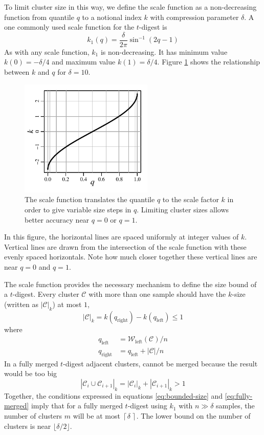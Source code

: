 \documentclass[]{statsoc}
\begin{document}
To limit cluster size in this way, we define the scale function as a non-decreasing function from quantile $q$ to a notional index $k$ with compression parameter $\delta$. A one commonly used  scale function for the $t$-digest is 
\begin{equation}
k_1(q) = \frac \delta {2\pi}  { {\sin^{-1} (2q-1)} }    
\end{equation}
As with any scale function, $k_1$ is non-decreasing. It has minimum value  $k(0)=-\delta/4$ and maximum value  $k(1)=\delta/4$.  Figure \ref{fig:k-q-plot} shows the relationship between $k$ and $q$ for $\delta=10$. 
\begin{figure}[htbp] %
   \centering
   \includegraphics[width=2.5in]{figures/k-q-plot.pdf} 
   \caption{The scale function translates the quantile $q$ to the scale factor $k$ in order to give variable size steps in $q$. Limiting cluster sizes allows better accuracy near $q=0$ or $q=1$. }
   \label{fig:k-q-plot}
\end{figure}
In this figure, the horizontal lines are spaced uniformly at integer values of $k$. Vertical lines are drawn from the intersection of the scale function with these evenly spaced horizontals. Note how much closer together these vertical lines are near $q=0$ and $q=1$.

The scale function provides the necessary mechanism to define the size bound of a $t$-digest. Every cluster $\mathcal C$ with more than one sample should have the $k$-size (written as $|\mathcal C|_k$) at most $1$,
\begin{equation}
\label{eq:bounded-size}
|\mathcal C|_k = k \left (q_{\mathrm {right}} \right) - k \left ( q_{\mathrm {left}} \right) \le 1
\end{equation}
where
\begin{align*}
q_{\mathrm {left}} &= {\mathcal W}_{\mathrm{left}}(\mathcal C)/n \\
q_{\mathrm {right}} &= q_{\mathrm {left}} + {| \mathcal C | / n} 
\end{align*}
In a fully merged $t$-digest adjacent clusters, cannot be merged because the result would be too big 
\begin{equation}
\label{eq:fully-merged}
|\mathcal C_i \cup \mathcal C_{i+1} |_k = |\mathcal C_i|_k + |\mathcal C_{i+1}|_k > 1
\end{equation}
Together, the conditions expressed in equations \ref{eq:bounded-size} and \ref{eq:fully-merged} imply that for a fully merged $t$-digest using $k_1$ with $n \gg \delta$ samples, the number of clusters $m$ will be at most $ \left \lceil\delta \,\right \rceil $.  The lower bound  on the number of clusters is near $ \lfloor\delta/2\rfloor $.
\end{document}
